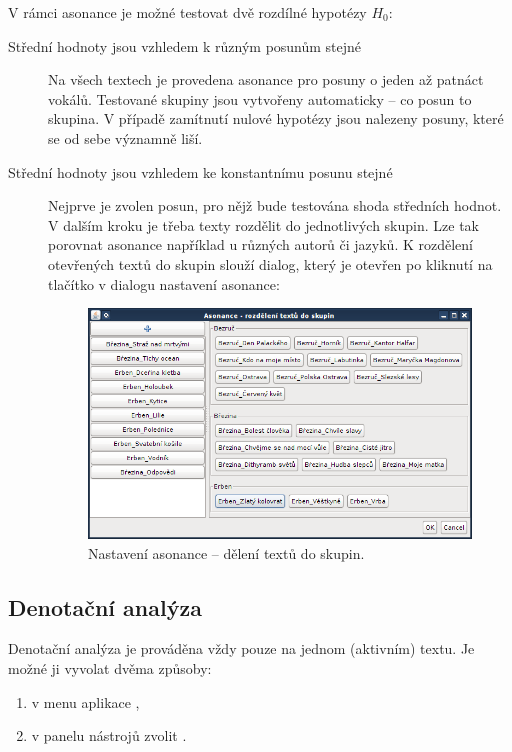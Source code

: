 \documentclass[dp.tex]{subfiles}
\begin{document}
V rámci asonance je možné testovat dvě rozdílné hypotézy $H_0$:
\begin{description}
\item[Střední hodnoty jsou vzhledem k různým posunům stejné] Na všech textech je provedena asonance pro posuny o jeden až patnáct vokálů. Testované skupiny jsou vytvořeny automaticky -- co posun to skupina. V případě zamítnutí nulové hypotézy jsou nalezeny posuny, které se od sebe významně liší. 

\item[Střední hodnoty jsou vzhledem ke konstantnímu posunu stejné] Nejprve je zvolen posun, pro nějž bude testována shoda středních hodnot. V dalším kroku je třeba texty rozdělit do jednotlivých skupin. Lze tak porovnat asonance například u různých autorů či jazyků. K rozdělení otevřených textů do skupin slouží dialog, který je otevřen po kliknutí na tlačítko  v dialogu nastavení asonance:
\begin{figure}[H]
\centering
\includegraphics[max width=\textwidth,keepaspectratio=true]{imgs-60-aplikace/gui-asonance-settings-groups}
\caption{Nastavení asonance -- dělení textů do skupin.}
\label{fig:gui-asonance-settings-groups}
\end{figure}

\end{description}


\subsection{Denotační analýza}
\label{chap:app-denotation-analysis}
Denotační analýza je prováděna vždy pouze na jednom (aktivním) textu. Je možné ji vyvolat dvěma způsoby:

\begin{enumerate}
\item v menu aplikace ,
\item v panelu nástrojů zvolit .
\\
\end{enumerate}
\end{document}
